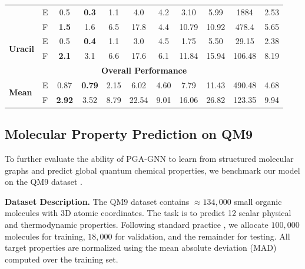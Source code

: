 \documentclass[10pt]{article}
\begin{document}
\begin{table}[t]
{\begin{tabular}{llccccc|ccc||c}
             & E & 0.5             & \textbf{0.3}        & 1.1           & 4.0           & 4.2 & 3.10            & 5.99              & 1884            & 2.53                    \\
             & F & \textbf{1.5}    & 1.6                 & 6.5           & 17.8          & 4.4 & 10.79           & 10.92             & 478.4           & 5.65                    \\
            \hline
            \multirow{2}{*}{\textbf{Uracil}}
             & E & 0.5             & \textbf{0.4}        & 1.1           & 3.0           & 4.5 & 1.75            & 5.50              & 29.15           & 2.38                    \\
             & F & \textbf{2.1}    & 3.1                 & 6.6           & 17.6          & 6.1 & 11.84           & 15.94             & 106.48          & 8.19                   \\
            \midrule
            \multicolumn{11}{c}{\textbf{Overall Performance}}                                                                                                                                  \\
            \midrule
            \multirow{2}{*}{\textbf{Mean}}
             & E & 0.87 & \textbf{0.79} & 2.15 & 6.02 & 4.60 & 7.79 & 11.43 & 490.48 & 4.68 \\
             & F & \textbf{2.92} & 3.52 & 8.79 & 22.54 & 9.01 & 16.06 & 26.82 & 123.35 & 9.94 \\
            \bottomrule

\end{tabular}%
    }
    \label{tab:md17_results}
\end{table}

\subsection{Molecular Property Prediction on QM9}

To further evaluate the ability of PGA-GNN to learn from structured molecular graphs and predict global quantum chemical properties, we benchmark our model on the QM9 dataset \citep{qm9}.

\noindent\textbf{Dataset Description.}
The QM9 dataset \citep{qm9} contains $\approx 134,000$ small organic molecules with 3D atomic coordinates. The task is to predict 12 scalar physical and thermodynamic properties. Following standard practice \citep{cormorant}, we allocate $100,000$ molecules for training, $18,000$ for validation, and the remainder for testing. All target properties are normalized using the mean absolute deviation (MAD) computed over the training set.
\end{document}

